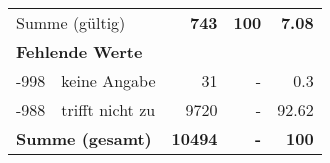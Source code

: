 \begin{longtable}{lXrrr}
     \midrule
     \multicolumn{2}{l}{Summe (gültig)} &
       \textbf{\num{743}} &
     \textbf{\num{100}} &
       \textbf{\num[round-mode=places,round-precision=2]{7.08}} \\
     \multicolumn{5}{l}{\textbf{Fehlende Werte}}\\
       -998 &
       keine Angabe &
         \num{31} &
        - &
         \num[round-mode=places,round-precision=2]{0.3} \\
       -988 &
       trifft nicht zu &
         \num{9720} &
        - &
         \num[round-mode=places,round-precision=2]{92.62} \\
     \midrule
     \multicolumn{2}{l}{\textbf{Summe (gesamt)}} &
          \textbf{\num{10494}} &
        \textbf{-} &
        \textbf{\num{100}} \\
     \bottomrule
     \end{longtable}
     
